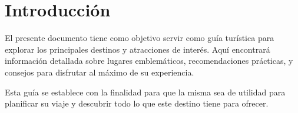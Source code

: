 \chapter{Introducción}

El presente documento tiene como objetivo servir como guía turística para explorar los principales destinos y atracciones de interés. Aquí encontrará información detallada sobre lugares emblemáticos, recomendaciones prácticas, y consejos para disfrutar al máximo de su experiencia.

Esta guía se establece con la finalidad para que la misma sea de utilidad para planificar su viaje y descubrir todo lo que este destino tiene para ofrecer.
